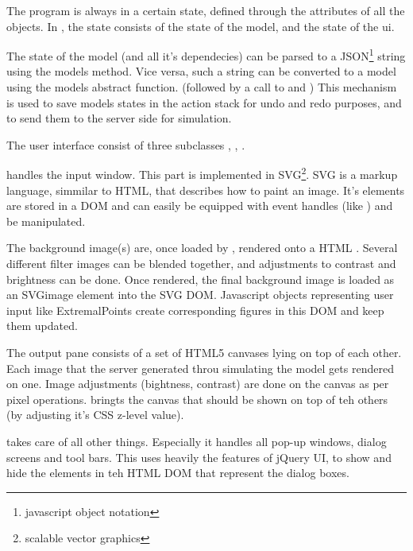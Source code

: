 The program is always in a certain state, defined through the attributes of all the objects.
In \spl, the state consists of the state of the model, and the state of the ui.

The state of the model (and all it's dependecies) can be parsed to a JSON\footnote{javascript object notation} string using the models  method.
Vice versa, such a string can be converted to a model using the models abstract  function. (followed by a call to  and )
This mechanism is used to save models states in the action stack for undo and redo purposes, and to send them to the server side for simulation.


The user interface  consist of three subclasses , , .

 handles the input window. This part is implemented in SVG\footnote{scalable vector graphics}. SVG is a markup language, simmilar to HTML, that describes how to paint an image. It's elements are stored in a DOM and can easily be equipped with event handles (like ) and be manipulated.

The background image(s) are, once loaded by , rendered onto a HTML .
Several different filter images can be blended together, and adjustments to contrast and brightness can be done.
Once rendered, the final background image is loaded as an SVGimage element into the SVG DOM. Javascript objects representing user input like ExtremalPoints create corresponding figures in this DOM and keep them updated.

The output pane  consists of a set of HTML5 canvases lying on top of each other.
Each image that the server generated throu simulating the model gets rendered on one.
Image adjustments (bightness, contrast) are done on the canvas as per pixel operations.  bringts the canvas that should be shown on top of teh others (by adjusting it's CSS z-level value).

 takes care of all other things. Especially it handles all pop-up windows, dialog screens and tool bars.
This uses heavily the features of jQuery UI, to show and hide the elements in teh HTML DOM that represent the dialog boxes.




